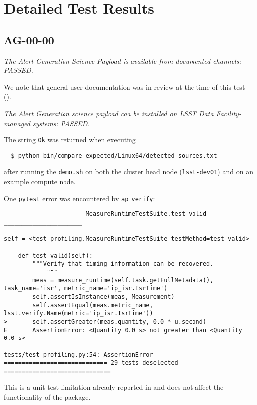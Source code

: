 \documentclass[DM,STR,toc]{lsstdoc}
\begin{document}
\section{Detailed Test Results}
\label{sect:detailed}

\subsection{AG-00-00}
\label{sect:ag-00-00}

\textit{The Alert Generation Science Payload is available from documented channels: PASSED.}

We note that general-user documentation was in review at the time of this test ().

\textit{The Alert Generation science payload can be installed on LSST Data Facility-managed systems: PASSED.}

The string \texttt{Ok} was returned when executing

\begin{verbatim}
  $ python bin/compare expected/Linux64/detected-sources.txt
\end{verbatim}

after running the \texttt{demo.sh} on both the cluster head node (\texttt{lsst-dev01}) and on an example compute node.

One \texttt{pytest} error was encountered by \texttt{ap\_verify}:

\begin{verbatim}
______________________ MeasureRuntimeTestSuite.test_valid ______________________

self = <test_profiling.MeasureRuntimeTestSuite testMethod=test_valid>

    def test_valid(self):
        """Verify that timing information can be recovered.
            """
        meas = measure_runtime(self.task.getFullMetadata(), task_name='isr', metric_name='ip_isr.IsrTime')
        self.assertIsInstance(meas, Measurement)
        self.assertEqual(meas.metric_name, lsst.verify.Name(metric='ip_isr.IsrTime'))
>       self.assertGreater(meas.quantity, 0.0 * u.second)
E       AssertionError: <Quantity 0.0 s> not greater than <Quantity 0.0 s>

tests/test_profiling.py:54: AssertionError
============================= 29 tests deselected ==============================\end{verbatim}

This is a unit test limitation already reported in  and does not affect the functionality of the package.
\end{document}
